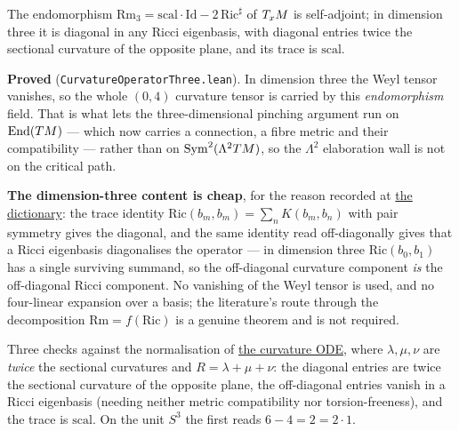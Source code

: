 \begin{lemma}
  \label{lem:curvature-operator-three}
  \leanok
  The endomorphism $\mathrm{Rm}_3 = \mathrm{scal}\cdot\mathrm{Id} - 2\,\mathrm{Ric}^\sharp$ of
  $T_xM$ is self-adjoint; in dimension three it is diagonal in any Ricci eigenbasis, with
  diagonal entries twice the sectional curvature of the opposite plane, and its trace is
  $\mathrm{scal}$.

  \textbf{Proved} (\texttt{CurvatureOperatorThree.lean}). In dimension three the Weyl tensor
  vanishes, so the whole $(0,4)$ curvature tensor is carried by this \emph{endomorphism}
  field. That is what lets the three-dimensional pinching argument run on
  $\mathrm{End}(TM)$ --- which now carries a connection, a fibre metric and their
  compatibility --- rather than on $\mathrm{Sym}^2(\Lambda^2 TM)$, so the $\Lambda^2$
  elaboration wall is not on the critical path.

  \textbf{The dimension-three content is cheap}, for the reason recorded at
  \hyperref[lem:curvature-three]{the dictionary}: the trace identity
  $\mathrm{Ric}(b_m,b_m) = \sum_n K(b_m,b_n)$ with pair symmetry gives the diagonal, and the
  same identity read off-diagonally gives that a Ricci eigenbasis diagonalises the operator
  --- in dimension three $\mathrm{Ric}(b_0,b_1)$ has a single surviving summand, so the
  off-diagonal curvature component \emph{is} the off-diagonal Ricci component. No vanishing
  of the Weyl tensor is used, and no four-linear expansion over a basis; the literature's
  route through the decomposition $\mathrm{Rm} = f(\mathrm{Ric})$ is a genuine theorem and is
  not required.

  Three checks against the normalisation of \hyperref[lem:pinching-ode]{the curvature ODE},
  where $\lambda,\mu,\nu$ are \emph{twice} the sectional curvatures and
  $R = \lambda+\mu+\nu$: the diagonal entries are twice the sectional curvature of the
  opposite plane, the off-diagonal entries vanish in a Ricci eigenbasis (needing neither
  metric compatibility nor torsion-freeness), and the trace is $\mathrm{scal}$. On the unit
  $S^3$ the first reads $6 - 4 = 2 = 2\cdot 1$.
\end{lemma}

